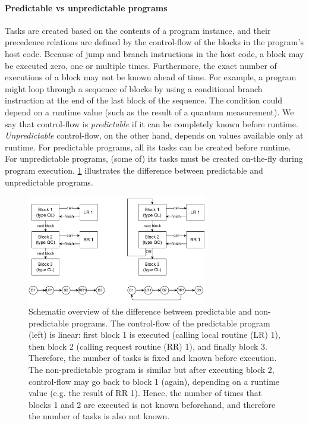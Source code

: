 \paragraph{Predictable vs unpredictable programs}
Tasks are created based on the contents of a program instance, and their precedence relations are defined by the control-flow of the blocks in the program's host code.
Because of jump and branch instructions in the host code, a block may be executed zero, one or multiple times.
Furthermore, the exact number of executions of a block may not be known ahead of time.
For example, a program might loop through a sequence of blocks by using a conditional branch instruction at the end of the last block of the sequence.
The condition could depend on a runtime value (such as the result of a quantum measurement).
We say that control-flow is \textit{predictable} if it can be completely known before runtime. 
\textit{Unpredictable} control-flow, on the other hand, depends on values available only at runtime. 
For predictable programs, all its tasks can be created before runtime.
For unpredictable programs, (some of) its tasks must be created on-the-fly during program execution.
\cref{qoala:fig:app:linear_non_linear} illustrates the difference between predictable and unpredictable programs.

\begin{figure}[t]
    \centering
    \includegraphics[width=0.7\textwidth]{figures/qoala/linear-non-linear.pdf}
    \caption{Schematic overview of the difference between predictable and non-predictable programs.
    The control-flow of the predictable program (left) is linear: first block 1 is executed (calling local routine (LR) 1), then block 2 (calling request routine (RR) 1), and finally block 3.
    Therefore, the number of tasks is fixed and known before execution.
    The non-predictable program is similar but after executing block 2, control-flow may go back to block 1 (again), depending on a runtime value (e.g. the result of RR 1).
    Hence, the number of times that blocks 1 and 2 are executed is not known beforehand, and therefore the number of tasks is also not known.
    }
    \label{qoala:fig:app:linear_non_linear}
\end{figure}

